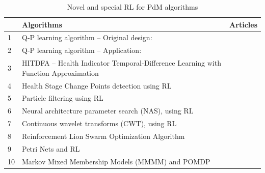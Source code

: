 \documentclass[12pt,oneside]{book}
\renewcommand{\arraystretch}{1.5}
\begin{document}
\begin{table}[h]
	\renewcommand\arraystretch{1.5}
	\begin{center}
		\begin{minipage}{\textwidth}
			\caption{Novel and special RL for PdM algorithms}\label{tbl:AlgoListSpecialized}
			\begin{tabular}{@{} R{0.5cm} L{6.5cm} L{6.5cm}@{}}
				\toprule
				&\textbf{Algorithms}&\textbf{Articles}\\
				&Q-P learning algorithm -- Original design:& \cite{gosavi2004qp}\\
				2&Q-P learning algorithm -- Application:& \cite{ Min2012176, Wang20149}\\
				3&HITDFA -- Health Indicator Temporal-Difference Learning with Function Approximation&\cite{Zhang2019488}\\
				4&Health Stage Change Points detection using RL&\cite{Cheng2018}\\
				5&Particle filtering using RL& \cite{Skordilis2020}\\
				6&Neural architecture parameter search (NAS), using RL & \cite{Eltotongy2021117}\\
				7&Continuous wavelet transforms (CWT), using RL& \cite{Eltotongy2021117}\\
				8&Reinforcement Lion Swarm Optimization Algorithm & \cite{Dai2021}\\
				9&Petri Nets and RL & \cite{Mao2021}\\
				10&Markov Mixed Membership Models (MMMM) and POMDP & \cite{Hofmann2020464}\\
				\bottomrule
			\end{tabular}
		\end{minipage}
	\end{center}
\end{table}
	
\end{document}

